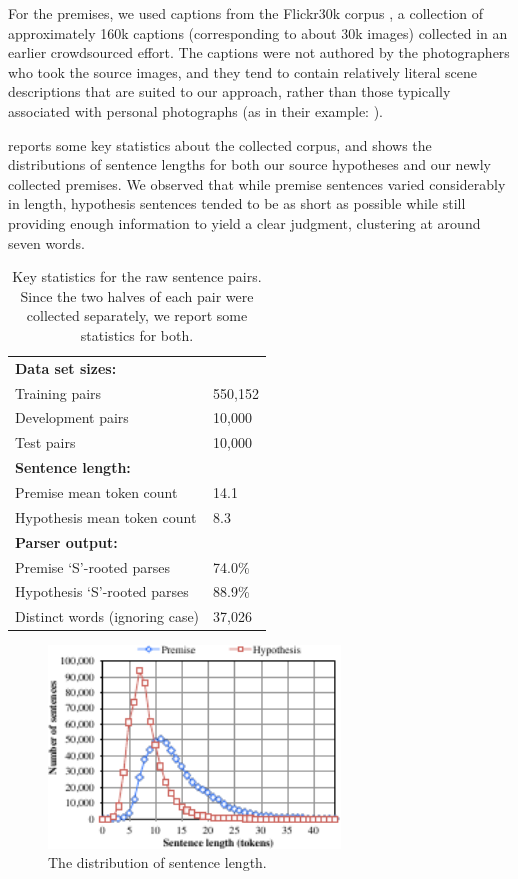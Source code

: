 For the premises, we used captions from the Flickr30k corpus \cite{hodoshimage}, a collection of approximately 160k captions (corresponding to about 30k images) collected in an earlier crowdsourced effort. The captions were not authored by the photographers who took the source images, and they tend to contain relatively literal scene descriptions that are suited to our approach, rather than those typically associated with personal photographs (as in their example: ).

 reports some key statistics about the collected corpus, and  shows the distributions of sentence lengths for both our source hypotheses and our newly collected premises. We observed that while premise sentences varied considerably in length, hypothesis sentences tended to be as short as possible while still providing enough information to yield a clear judgment, clustering at around seven words.

\begin{table}
\center
  \begin{tabular}{l l} 
    \toprule
\multicolumn{2}{l}{\textbf{Data set sizes:}}\\
Training pairs &  550,152\\
Development pairs &  10,000\\
Test pairs & 10,000\\
\midrule
\multicolumn{2}{l}{\textbf{Sentence length:}}\\
Premise mean token count & 14.1\\
Hypothesis mean token count & 8.3 \\
\midrule
\multicolumn{2}{l}{\textbf{Parser output:}}\\
Premise `S'-rooted parses & 74.0\%\\
Hypothesis `S'-rooted parses & 88.9\%\\
Distinct words (ignoring case) & 37,026\\
    \bottomrule
  \end{tabular}
\caption{\label{collection-stats}Key statistics for the raw sentence pairs. Since the two halves of each pair were collected separately, we report some statistics for both.} 
\end{table}


\begin{figure}
\center
\includegraphics[width=3.05in]{length_dist}
\caption{\label{length-dist}The distribution of sentence length.} 
\end{figure}

